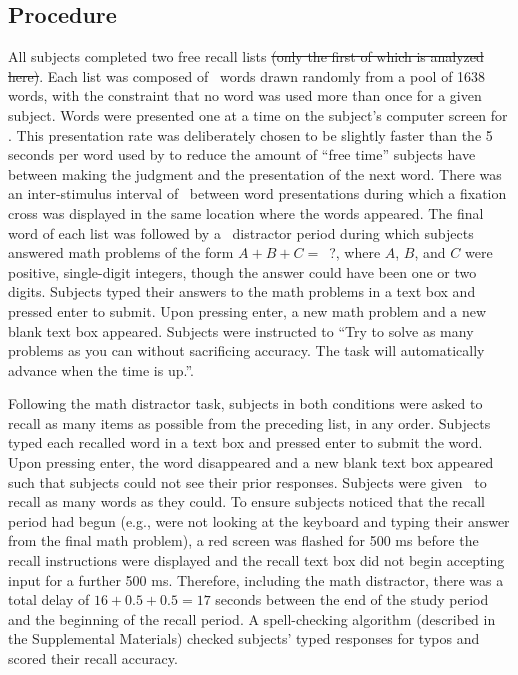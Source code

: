 \documentclass[man,natbib,floatsintext]{apa6} %
\begin{document}
\subsection{Procedure}
All subjects completed two free recall lists \st{(only the first of which is analyzed here)}. Each list was composed of \listlength~words drawn randomly from a pool of 1638 words, with the constraint that no word was used more than once for a given subject. Words were presented one at a time on the subject's computer screen for \presrate. This presentation rate was deliberately chosen to be slightly faster than the 5 seconds per word used by \citet{NairEtal17} to reduce the amount of ``free time'' subjects have between making the judgment and the presentation of the next word.
There was an inter-stimulus interval of \isi~between word presentations during which a fixation cross was displayed in the same location where the words appeared. The final word of each list was followed by a \DFRDelay~distractor period during which subjects answered math problems of the form $A+B+C=$~?, where $A$, $B$, and $C$ were positive, single-digit integers, though the answer could have been one or two digits. Subjects typed their answers to the math problems in a text box and pressed enter to submit. Upon pressing enter, a new math problem and a new blank text box appeared. Subjects were instructed to ``Try to solve as many problems as you can without sacrificing accuracy. The task will automatically advance when the time is up.''.

Following the math distractor task, subjects in both conditions were asked to recall as many items as possible from the preceding list, in any order. Subjects typed each recalled word in a text box and pressed enter to submit the word. Upon pressing enter, the word disappeared and a new blank text box appeared such that subjects could not see their prior responses. Subjects were given \recalltime~to recall as many words as they could. To ensure subjects noticed that the recall period had begun (e.g., were not looking at the keyboard and typing their answer from the final math problem), a red screen was flashed for 500 ms before the recall instructions were displayed and the recall text box did not begin accepting input for a further 500 ms. Therefore, including the math distractor, there was a total delay of $16+0.5+0.5=17$ seconds between the end of the study period and the beginning of the recall period. A spell-checking algorithm (described in the Supplemental Materials) checked subjects' typed responses for typos and scored their recall accuracy.
\end{document}

